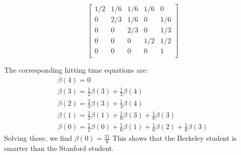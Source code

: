 \begin{enumerate}[label=\alph*)]
\begin{solution}[9cm]
\[
\begin{bmatrix}
1/2 & 1/6 & 1/6 & 1/6 & 0\\
0 & 2/3 & 1/6 & 0 & 1/6\\
0 & 0 & 2/3 & 0 & 1/3\\
0 & 0 & 0 & 1/2 & 1/2\\
0 & 0 & 0 & 0 & 1\\
\end{bmatrix}
\]

The corresponding hitting time equations are:
\begin{gather*}
\beta(4) = 0\\
\beta(3) = \frac{1}{2}\beta(3) + \frac{1}{2}\beta(4)\\
\beta(2) = \frac{2}{3}\beta(3) + \frac{1}{3}\beta(4)\\
\beta(1) = \frac{2}{3}\beta(1) + \frac{1}{6}\beta(3) + \frac{1}{6}\beta(3)\\
\beta(0) = \frac{1}{2}\beta(0) + \frac{1}{6}\beta(1) + \frac{1}{6}\beta(2) + 
\frac{1}{6}\beta(3)
\end{gather*}
Solving these, we find $\beta(0) = \frac{31}{6}$
This shows that the Berkeley student is smarter than the Stanford student.
\end{solution}

\end{enumerate}
